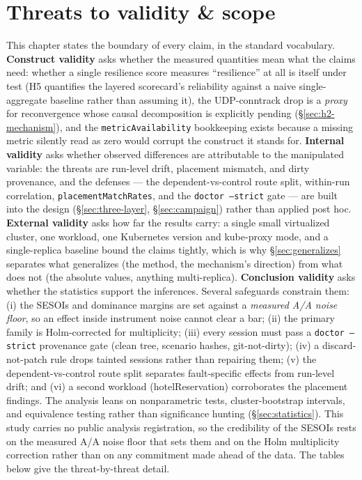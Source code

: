 \chapter{Threats to validity \& scope}\label{ch:threats}

This chapter states the boundary of every claim, in the standard vocabulary.
\textbf{Construct validity} asks whether the measured quantities mean what the
claims need: whether a single resilience score measures ``resilience'' at all is
itself under test (H5 quantifies the layered scorecard's reliability against a
naive single-aggregate baseline rather than assuming it), the UDP-conntrack drop
is a \emph{proxy} for reconvergence whose causal decomposition is explicitly
pending (\S\ref{sec:h2-mechanism}), and the \texttt{metricAvailability}
bookkeeping exists because a missing metric silently read as zero would corrupt
the construct it stands for. \textbf{Internal validity} asks whether observed
differences are attributable to the manipulated variable: the threats are
run-level drift, placement mismatch, and dirty provenance, and the defenses ---
the dependent-vs-control route split, within-run correlation,
\texttt{placementMatchRates}, and the \texttt{doctor --strict} gate --- are built
into the design (\S\ref{sec:three-layer}, \S\ref{sec:campaign}) rather than
applied post hoc. \textbf{External validity} asks how far the results carry: a
single small virtualized cluster, one workload, one Kubernetes version and
kube-proxy mode, and a single-replica baseline bound the claims tightly, which is
why \S\ref{sec:generalizes} separates what generalizes (the method, the
mechanism's direction) from what does not (the absolute values, anything
multi-replica). \textbf{Conclusion validity} asks whether the statistics support
the inferences. Several safeguards constrain them: (i) the SESOIs and dominance
margins are set against a \emph{measured A/A noise floor}, so an effect inside
instrument noise cannot clear a bar; (ii) the primary family is Holm-corrected
for multiplicity; (iii) every session must pass a \texttt{doctor --strict}
provenance gate (clean tree, scenario hashes, git-not-dirty); (iv) a
discard-not-patch rule drops tainted sessions rather than repairing them; (v) the
dependent-vs-control route split separates fault-specific effects from run-level
drift; and (vi) a second workload (hotelReservation) corroborates the placement
findings. The analysis leans on nonparametric tests, cluster-bootstrap
intervals, and equivalence testing rather than significance hunting
(\S\ref{sec:statistics}). This study carries no public analysis registration, so
the credibility of the SESOIs rests on the measured A/A noise floor that sets
them and on the Holm multiplicity correction rather than on any commitment made
ahead of the data. The tables below give the threat-by-threat detail.

